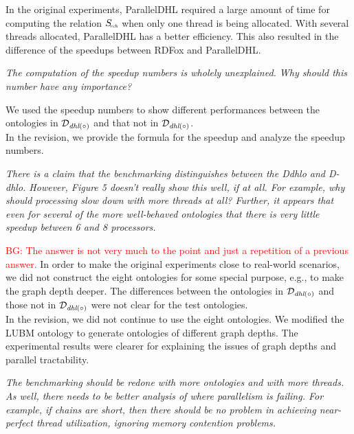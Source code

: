 \documentclass{article}
\let\quoteOld\quote
\let\endquoteOld\endquote
\renewenvironment{quote}{\quoteOld\itshape}{\endquoteOld}
\newcommand{\BG}[1]{\textcolor{red}{BG: #1}}
\begin{document}
In the original experiments, ParallelDHL required a large amount of time for computing
the relation $S_{\textit{\!\tiny rch}}$ when only one thread is being allocated.
With several threads allocated, ParallelDHL has a better efficiency.
This also resulted in the difference of the speedups between RDFox and ParallelDHL.


\begin{quote}
The computation of the speedup numbers is wholely unexplained.  Why should
this number have any importance?
\end{quote}


We used the speedup numbers to show different performances between the
ontologies in $\mathcal{D}_{\textit{\text{dhl}}(\circ)}$ and
that not in $\mathcal{D}_{\textit{\text{dhl}}(\circ)}$.\\

In the revision, we provide the formula for the speedup and analyze
the speedup numbers.


\begin{quote}
There is a claim that the benchmarking distinguishes between the Ddhlo and
D-dhlo.  However, Figure 5 doesn't really show this well, if at all.   For
example, why should processing slow down with more threads at all?  Further,
it appears that even for several of the more well-behaved ontologies that there
is very little speedup between 6 and 8 processors.
\end{quote}

\BG{The answer is not very much to the point and just a repetition of
  a previous answer.}
In order to make the original experiments close to real-world scenarios, we did not
construct the eight ontologies for some special purpose, e.g., to
make the graph depth deeper.
The differences between the ontologies in
$\mathcal{D}_{\textit{\text{dhl}}(\circ)}$ and those not in
$\mathcal{D}_{\textit{\text{dhl}}(\circ)}$ were not clear
for the test ontologies.\\

In the revision, we did not continue to use the eight ontologies.
We modified the LUBM ontology to generate ontologies of different graph depths.
The experimental results were clearer for explaining the issues of graph depths
and parallel tractability.


\begin{quote}
The benchmarking should be redone with more ontologies and with more
threads.  As well, there needs to be better analysis of where parallelism is
failing.  For example, if chains are short, then there should be no problem
in achieving near-perfect thread utilization, ignoring memory contention
problems.
\end{quote}
\end{document}
